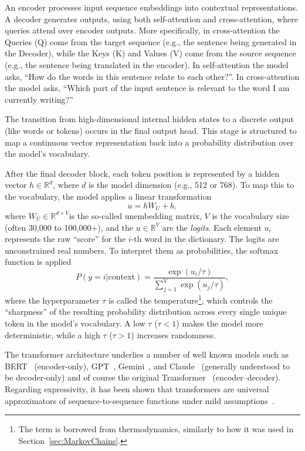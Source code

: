 An encoder processes input sequence embeddings into contextual representations. A decoder generates outputs, using both self-attention and cross-attention, where queries attend over encoder outputs. More specifically, in cross-attention the Queries (Q) come from the target sequence (e.g., the sentence being generated in the Decoder), while the Keys (K) and Values (V) come from the source sequence (e.g., the sentence being translated in the encoder).
In self-attention the model asks, ``How do the words in this sentence relate to each other?''. 
In cross-attention the model asks, ``Which part of the input sentence is relevant to the word I am currently writing?''

\bigskip
The transition from high-dimensional internal hidden states to a discrete output (like words or tokens) occurs in the final output head. This stage is structured to map a continuous vector representation back into a probability distribution over the model's vocabulary.

After the final decoder block, each token position is represented by a hidden vector $h \in \mathbb{R}^d$, where $d$ is the model dimension (e.g., 512 or 768). To map this to the vocabulary, the model applies a linear transformation
$$u = h W_U + b,$$
where $W_U \in \mathbb{R}^{d \times V}$is the so-called unembedding matrix, $V$ is the vocabulary size (often 30,000 to 100,000+), and the 
$u \in \mathbb{R}^V$ are the {\em logits}. Each element $u_i$ represents the raw ``score'' for the $i$-th word in the dictionary. The logits are unconstrained real numbers. To interpret them as probabilities, the softmax function is applied
$$P(y = i | \text{context}) = \frac{\exp(u_i / \tau)}{\sum_{j=1}^{V} \exp(u_j / \tau)},$$
where the hyperparameter $\tau$ is called the temperature\footnote{The term is borrowed from thermodynamics, similarly to how it was used in Section~\ref{sec:MarkovChains}.%
}, which controls the ``sharpness'' of the resulting probability distribution across every single unique token in the model's vocabulary. A low $\tau$ ($\tau < 1$) makes the model more deterministic, while a high $\tau$ ($\tau > 1$) increases randomness.






\bigskip
The transformer architecture underlies a number of well known models such as BERT~\cite{devlin2019bert} (encoder-only), GPT~\cite{radford2018improving}, Gemini~\cite{team2023gemini}, and Claude~\cite{anthropic2024claude3} (generally understood to be decoder-only) and of course the original Transformer~\cite{vaswani2017attention} (encoder–decoder). Regarding expressivity, it has been shown that transformers are universal approximators of sequence-to-sequence functions under mild assumptions~\cite{yun2019transformers}.

